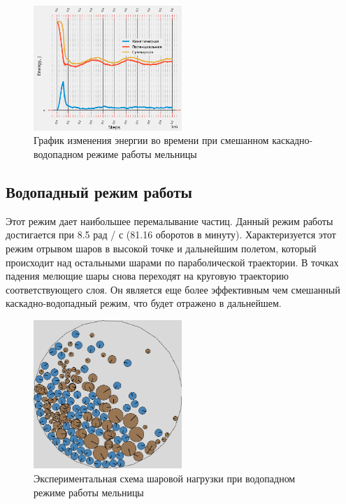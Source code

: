 \documentclass[utf8x, 14pt, oneside, a4paper]{article}
\begin{document}
\begin{figure}[H]
	\centering
	\includegraphics[width=0.5\textwidth]{smeshan_energy} 
	\caption{График изменения энергии во времени при смешанном каскадно-водопадном режиме работы мельницы}
	\label{pic:smeshan_energy}
\end{figure} 


\subsection{Водопадный режим работы}

Этот режим дает наибольшее перемалывание частиц.
Данный режим работы достигается при 8.5 рад / с (81.16 оборотов в минуту).
Характеризуется этот режим отрывом шаров в высокой точке и дальнейшим полетом, который происходит над остальными шарами по параболической траектории.
В точках падения мелющие шары снова переходят на круговую траекторию соответствующего слоя.
Он является еще более эффективным чем смешанный каскадно-водопадный режим, что будет отражено в дальнейшем.

\begin{figure}[H]
	\centering
	\includegraphics[width=0.5\textwidth]{vodopad_result} 
	\caption{Экспериментальная схема шаровой нагрузки при водопадном режиме работы мельницы}
	\label{pic:vodopad_result}
\end{figure} 
\end{document}
